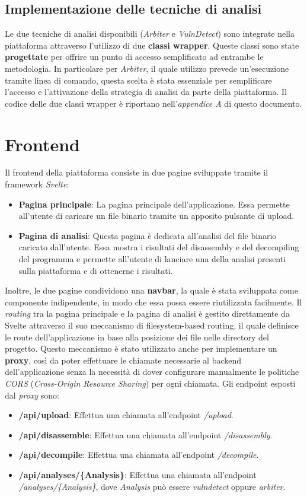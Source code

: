 \documentclass[../main.tex]{subfiles}
\begin{document}
\subsection{Implementazione delle tecniche di analisi}
Le due tecniche di analisi disponibili (\textit{Arbiter} e \textit{VulnDetect}) sono integrate nella piattaforma
attraverso l'utilizzo di due \textbf{classi wrapper}. Queste classi sono state \textbf{progettate} per offrire un
punto di accesso semplificato ad entrambe le metodologia. In particolare per \textit{Arbiter}, il quale utilizzo prevede un'esecuzione
tramite linea di comando, questa scelta è stata essenziale per semplificare l'accesso e l'attivazione della strategia di analisi da parte della piattaforma.
Il codice delle due classi wrapper è riportano nell'\textit{appendice A} di questo documento.
\section{Frontend}
Il frontend della piattaforma consiste in due pagine sviluppate tramite il framework \textit{Svelte}:
\begin{itemize}
    \item \textbf{Pagina principale}: La pagina principale dell'applicazione. Essa permette all'utente di caricare un file binario tramite un apposito pulsante di upload.
    \item \textbf{Pagina di analisi}: Questa pagina è dedicata all'analisi del file binario caricato dall'utente. Essa mostra i risultati del disassembly e del decompiling
    del programma e permette all'utente di lanciare una della analisi presenti sulla piattaforma e di ottenerne i risultati.
\end{itemize}
Inoltre, le due pagine condividono una \textbf{navbar}, la quale è stata sviluppata come componente indipendente, in modo che essa possa essere riutilizzata facilmente.
Il \textit{routing} tra la pagina principale e la pagina di analisi è gestito direttamente da Svelte attraverso il suo meccanismo di filesystem-based routing, 
il quale definisce le route dell'applicazione in base alla posizione dei file nelle directory del progetto. Questo meccanismo è stato utilizzato anche per implementare un \textbf{proxy},
così da poter effettuare le chiamate necessarie al backend dell'applicazione senza la necessità di dover configurare manualmente le politiche \textit{CORS} (\textit{Cross-Origin Resource Sharing}) per ogni chiamata. 
Gli endpoint esposti dal \textit{proxy} sono:
\begin{itemize}
    \item \textbf{/api/upload}: Effettua una chiamata all'endpoint \textit{/upload}.
    \item \textbf{/api/disassemble}: Effettua una chiamata all'endpoint \textit{/disassembly}.
    \item \textbf{/api/decompile}: Effettua una chiamata all'endpoint \textit{/decompile}.
    \item \textbf{/api/analyses/\{Analysis\}}: Effettua una chiamata all'endpoint \textit{/analyses/\{Analysis\}}, dove \textit{Analysis} può essere \textit{vulndetect} oppure \textit{arbiter}.
\end{itemize}
\end{document}
